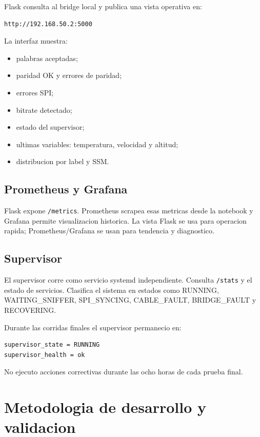 \documentclass[12pt,a4paper,oneside]{report}
\begin{document}
Flask consulta al bridge local y publica una vista operativa en:

\begin{lstlisting}
http://192.168.50.2:5000
\end{lstlisting}

La interfaz muestra:

\begin{itemize}
  \item palabras aceptadas;
  \item paridad OK y errores de paridad;
  \item errores SPI;
  \item bitrate detectado;
  \item estado del supervisor;
  \item ultimas variables: temperatura, velocidad y altitud;
  \item distribucion por label y SSM.
\end{itemize}

\section{Prometheus y Grafana}

Flask expone \texttt{/metrics}. Prometheus scrapea esas metricas desde la
notebook y Grafana permite visualizacion historica. La vista Flask se usa para
operacion rapida; Prometheus/Grafana se usan para tendencia y diagnostico.

\section{Supervisor}

El supervisor corre como servicio systemd independiente. Consulta \texttt{/stats}
y el estado de servicios. Clasifica el sistema en estados como RUNNING,
WAITING\_SNIFFER, SPI\_SYNCING, CABLE\_FAULT, BRIDGE\_FAULT y RECOVERING.

Durante las corridas finales el supervisor permanecio en:

\begin{lstlisting}
supervisor_state = RUNNING
supervisor_health = ok
\end{lstlisting}

No ejecuto acciones correctivas durante las ocho horas de cada prueba final.

\chapter{Metodologia de desarrollo y validacion}
\end{document}

